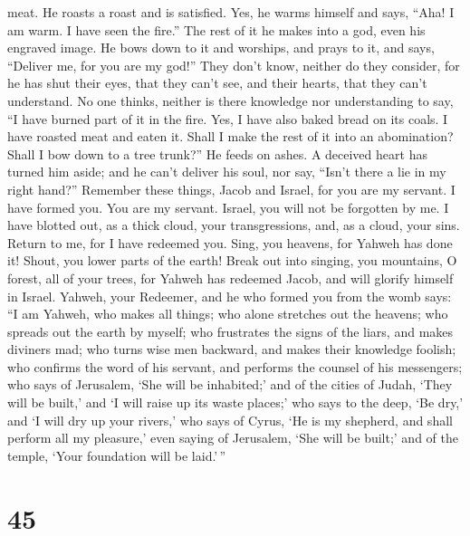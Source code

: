 meat. He roasts a roast and is satisfied. Yes, he warms himself and
says, ``Aha! I am warm. I have seen the fire.''  The rest
of it he makes into a god, even his engraved image. He bows down to it
and worships, and prays to it, and says, ``Deliver me, for you are my
god!''  They don't know, neither do they consider, for he
has shut their eyes, that they can't see, and their hearts, that they
can't understand.  No one thinks, neither is there
knowledge nor understanding to say, ``I have burned part of it in the
fire. Yes, I have also baked bread on its coals. I have roasted meat and
eaten it. Shall I make the rest of it into an abomination? Shall I bow
down to a tree trunk?''  He feeds on ashes. A deceived
heart has turned him aside; and he can't deliver his soul, nor say,
``Isn't there a lie in my right hand?''  Remember these
things, Jacob and Israel, for you are my servant. I have formed you. You
are my servant. Israel, you will not be forgotten by me.  I
have blotted out, as a thick cloud, your transgressions, and, as a
cloud, your sins. Return to me, for I have redeemed you. 
Sing, you heavens, for Yahweh has done it! Shout, you lower parts of the
earth! Break out into singing, you mountains, O forest, all of your
trees, for Yahweh has redeemed Jacob, and will glorify himself in
Israel.  Yahweh, your Redeemer, and he who formed you from
the womb says: ``I am Yahweh, who makes all things; who alone stretches
out the heavens; who spreads out the earth by myself;  who
frustrates the signs of the liars, and makes diviners mad; who turns
wise men backward, and makes their knowledge foolish;  who
confirms the word of his servant, and performs the counsel of his
messengers; who says of Jerusalem, `She will be inhabited;' and of the
cities of Judah, `They will be built,' and `I will raise up its waste
places;'  who says to the deep, `Be dry,' and `I will dry
up your rivers,'  who says of Cyrus, `He is my shepherd,
and shall perform all my pleasure,' even saying of Jerusalem, `She will
be built;' and of the temple, `Your foundation will be laid.'\,''

\hypertarget{section-43}{%
\section{45}\label{section-43}}

